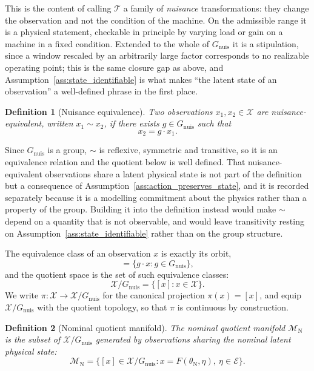 \documentclass[a4paper]{cas-sc}
\newtheorem{definition}{Definition}
\newcommand{\X}{\ensuremath{\mathcal{X}}}
\newcommand{\EtaSpace}{\ensuremath{\mathcal{E}}}
\newcommand{\Mnominal}{\ensuremath{\mathcal{M}_{\mathrm{N}}}}
\newcommand{\Gnuis}{\ensuremath{G_{\mathrm{nuis}}}}
\newcommand{\quotient}{\ensuremath{\mathcal{X}/G_{\mathrm{nuis}}}}
\begin{document}
This is the content of calling \(\mathcal{T}\) a family of \emph{nuisance}
transformations: they change the observation and not the condition of the
machine. On the admissible range it is a physical statement, checkable in
principle by varying load or gain on a machine in a fixed condition. Extended
to the whole of \(\Gnuis\) it is a stipulation, since a window rescaled by an
arbitrarily large factor corresponds to no realizable operating point; this is
the same closure gap as above, and Assumption~\ref{ass:state_identifiable}
is what makes ``the latent state of an observation'' a well-defined phrase in
the first place.

\begin{definition}[Nuisance equivalence]
\label{def:nuisance_equivalence}
Two observations \(x_1,x_2 \in \X\) are \emph{nuisance-equivalent}, written
\(x_1 \sim x_2\), if there exists \(g \in \Gnuis\) such that
\begin{equation}
x_2 = g \cdot x_1 .
\label{eq:equivalence}
\end{equation}
\end{definition}

Since \(\Gnuis\) is a group, \(\sim\) is reflexive, symmetric and transitive,
so it is an equivalence relation and the quotient below is well defined. That
nuisance-equivalent observations share a latent physical state is not part of
the definition but a consequence of
Assumption~\ref{ass:action_preserves_state}, and it is recorded separately
because it is a modelling commitment about the physics rather than a property
of the group. Building it into the definition instead would make \(\sim\)
depend on a quantity that is not observable, and would leave transitivity
resting on Assumption~\ref{ass:state_identifiable} rather than on the group
structure.

The equivalence class of an observation \(x\) is exactly its orbit,
\begin{equation}
[x] = \{g \cdot x : g \in \Gnuis\},
\label{eq:orbit}
\end{equation}
and the quotient space is the set of such equivalence classes:
\begin{equation}
\quotient = \{[x] : x \in \X\}.
\label{eq:quotient}
\end{equation}
We write \(\pi:\X\to\quotient\) for the canonical projection
\(\pi(x)=[x]\), and equip \(\quotient\) with the quotient topology, so that
\(\pi\) is continuous by construction.

\begin{definition}[Nominal quotient manifold]
\label{def:nominal_quotient_manifold}
The \emph{nominal quotient manifold} \(\Mnominal\) is the subset of
\(\quotient\) generated by observations sharing the nominal latent physical
state:
\begin{equation}
\Mnominal
=
\bigl\{[x] \in \quotient : x = F(\theta_{\mathrm{N}},\eta),
\ \eta \in \EtaSpace\bigr\}.
\label{eq:nominal_manifold}
\end{equation}
\end{definition}
\end{document}
